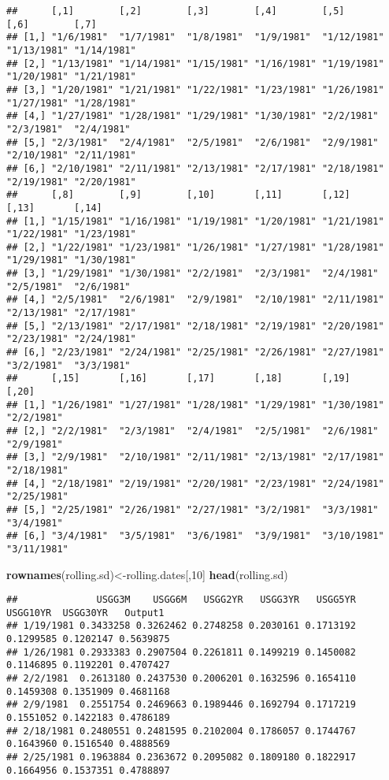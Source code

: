 \documentclass[]{article}
\newenvironment{Shaded}{\begin{snugshade}}{\end{snugshade}}
\newcommand{\KeywordTok}[1]{\textcolor[rgb]{0.13,0.29,0.53}{\textbf{#1}}}
\newcommand{\DecValTok}[1]{\textcolor[rgb]{0.00,0.00,0.81}{#1}}
\newcommand{\NormalTok}[1]{#1}
\begin{document}
\begin{verbatim}
##      [,1]        [,2]        [,3]        [,4]        [,5]        [,6]        [,7]       
## [1,] "1/6/1981"  "1/7/1981"  "1/8/1981"  "1/9/1981"  "1/12/1981" "1/13/1981" "1/14/1981"
## [2,] "1/13/1981" "1/14/1981" "1/15/1981" "1/16/1981" "1/19/1981" "1/20/1981" "1/21/1981"
## [3,] "1/20/1981" "1/21/1981" "1/22/1981" "1/23/1981" "1/26/1981" "1/27/1981" "1/28/1981"
## [4,] "1/27/1981" "1/28/1981" "1/29/1981" "1/30/1981" "2/2/1981"  "2/3/1981"  "2/4/1981" 
## [5,] "2/3/1981"  "2/4/1981"  "2/5/1981"  "2/6/1981"  "2/9/1981"  "2/10/1981" "2/11/1981"
## [6,] "2/10/1981" "2/11/1981" "2/13/1981" "2/17/1981" "2/18/1981" "2/19/1981" "2/20/1981"
##      [,8]        [,9]        [,10]       [,11]       [,12]       [,13]       [,14]      
## [1,] "1/15/1981" "1/16/1981" "1/19/1981" "1/20/1981" "1/21/1981" "1/22/1981" "1/23/1981"
## [2,] "1/22/1981" "1/23/1981" "1/26/1981" "1/27/1981" "1/28/1981" "1/29/1981" "1/30/1981"
## [3,] "1/29/1981" "1/30/1981" "2/2/1981"  "2/3/1981"  "2/4/1981"  "2/5/1981"  "2/6/1981" 
## [4,] "2/5/1981"  "2/6/1981"  "2/9/1981"  "2/10/1981" "2/11/1981" "2/13/1981" "2/17/1981"
## [5,] "2/13/1981" "2/17/1981" "2/18/1981" "2/19/1981" "2/20/1981" "2/23/1981" "2/24/1981"
## [6,] "2/23/1981" "2/24/1981" "2/25/1981" "2/26/1981" "2/27/1981" "3/2/1981"  "3/3/1981" 
##      [,15]       [,16]       [,17]       [,18]       [,19]       [,20]      
## [1,] "1/26/1981" "1/27/1981" "1/28/1981" "1/29/1981" "1/30/1981" "2/2/1981" 
## [2,] "2/2/1981"  "2/3/1981"  "2/4/1981"  "2/5/1981"  "2/6/1981"  "2/9/1981" 
## [3,] "2/9/1981"  "2/10/1981" "2/11/1981" "2/13/1981" "2/17/1981" "2/18/1981"
## [4,] "2/18/1981" "2/19/1981" "2/20/1981" "2/23/1981" "2/24/1981" "2/25/1981"
## [5,] "2/25/1981" "2/26/1981" "2/27/1981" "3/2/1981"  "3/3/1981"  "3/4/1981" 
## [6,] "3/4/1981"  "3/5/1981"  "3/6/1981"  "3/9/1981"  "3/10/1981" "3/11/1981"
\end{verbatim}

\begin{Shaded}
\begin{Highlighting}[]
\KeywordTok{rownames}\NormalTok{(rolling.sd)<-rolling.dates[,}\DecValTok{10}\NormalTok{]}
\KeywordTok{head}\NormalTok{(rolling.sd)}
\end{Highlighting}
\end{Shaded}

\begin{verbatim}
##              USGG3M    USGG6M   USGG2YR   USGG3YR   USGG5YR  USGG10YR  USGG30YR   Output1
## 1/19/1981 0.3433258 0.3262462 0.2748258 0.2030161 0.1713192 0.1299585 0.1202147 0.5639875
## 1/26/1981 0.2933383 0.2907504 0.2261811 0.1499219 0.1450082 0.1146895 0.1192201 0.4707427
## 2/2/1981  0.2613180 0.2437530 0.2006201 0.1632596 0.1654110 0.1459308 0.1351909 0.4681168
## 2/9/1981  0.2551754 0.2469663 0.1989446 0.1692794 0.1717219 0.1551052 0.1422183 0.4786189
## 2/18/1981 0.2480551 0.2481595 0.2102004 0.1786057 0.1744767 0.1643960 0.1516540 0.4888569
## 2/25/1981 0.1963884 0.2363672 0.2095082 0.1809180 0.1822917 0.1664956 0.1537351 0.4788897
\end{verbatim}
\end{document}
